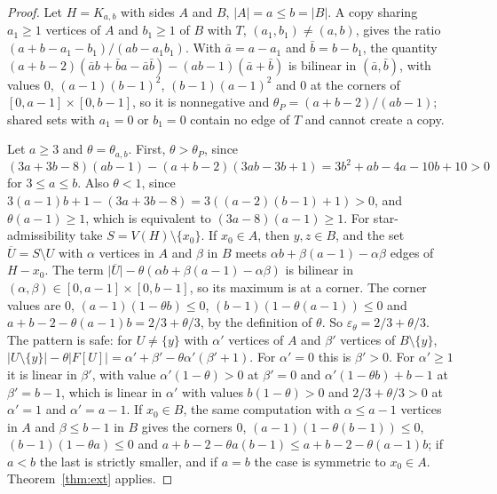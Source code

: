 \documentclass[11pt]{article}
\theoremstyle{remark}
\newcommand{\abs}[1]{\lvert #1\rvert}
\begin{document}
\begin{proof}
Let $H=K_{a,b}$ with sides $A$ and $B$, $\abs A=a\le b=\abs B$. A copy sharing $a_1\ge1$ vertices of $A$ and $b_1\ge1$ of $B$ with $T$, $(a_1,b_1)\ne(a,b)$, gives the ratio $(a+b-a_1-b_1)/(ab-a_1b_1)$. With $\bar a=a-a_1$ and $\bar b=b-b_1$, the quantity $(a+b-2)(\bar ab+\bar ba-\bar a\bar b)-(ab-1)(\bar a+\bar b)$ is bilinear in $(\bar a,\bar b)$, with values $0$, $(a-1)(b-1)^2$, $(b-1)(a-1)^2$ and $0$ at the corners of $[0,a-1]\times[0,b-1]$, so it is nonnegative and $\theta_P=(a+b-2)/(ab-1)$; shared sets with $a_1=0$ or $b_1=0$ contain no edge of $T$ and cannot create a copy.

Let $a\ge3$ and $\theta=\theta_{a,b}$. First, $\theta>\theta_P$, since
\[(3a+3b-8)(ab-1)-(a+b-2)(3ab-3b+1)=3b^2+ab-4a-10b+10>0\]
for $3\le a\le b$. Also $\theta<1$, since $3(a-1)b+1-(3a+3b-8)=3((a-2)(b-1)+1)>0$, and $\theta(a-1)\ge1$, which is equivalent to $(3a-8)(a-1)\ge1$. For star-admissibility take $S=V(H)\setminus\{x_0\}$. If $x_0\in A$, then $y,z\in B$, and the set $\overline U=S\setminus U$ with $\alpha$ vertices in $A$ and $\beta$ in $B$ meets $\alpha b+\beta(a-1)-\alpha\beta$ edges of $H-x_0$. The term $\abs{\overline U}-\theta(\alpha b+\beta(a-1)-\alpha\beta)$ is bilinear in $(\alpha,\beta)\in[0,a-1]\times[0,b-1]$, so its maximum is at a corner. The corner values are $0$, $(a-1)(1-\theta b)\le0$, $(b-1)(1-\theta(a-1))\le0$ and $a+b-2-\theta(a-1)b=2/3+\theta/3$, by the definition of $\theta$. So $\varepsilon_\theta=2/3+\theta/3$. The pattern is safe: for $U\ne\{y\}$ with $\alpha'$ vertices of $A$ and $\beta'$ vertices of $B\setminus\{y\}$, $\abs{U\setminus\{y\}}-\theta\abs{F[U]}=\alpha'+\beta'-\theta\alpha'(\beta'+1)$. For $\alpha'=0$ this is $\beta'>0$. For $\alpha'\ge1$ it is linear in $\beta'$, with value $\alpha'(1-\theta)>0$ at $\beta'=0$ and $\alpha'(1-\theta b)+b-1$ at $\beta'=b-1$, which is linear in $\alpha'$ with values $b(1-\theta)>0$ and $2/3+\theta/3>0$ at $\alpha'=1$ and $\alpha'=a-1$. If $x_0\in B$, the same computation with $\alpha\le a-1$ vertices in $A$ and $\beta\le b-1$ in $B$ gives the corners $0$, $(a-1)(1-\theta(b-1))\le0$, $(b-1)(1-\theta a)\le0$ and $a+b-2-\theta a(b-1)\le a+b-2-\theta(a-1)b$; if $a<b$ the last is strictly smaller, and if $a=b$ the case is symmetric to $x_0\in A$. Theorem~\ref{thm:ext} applies.


\end{proof}
\end{document}
